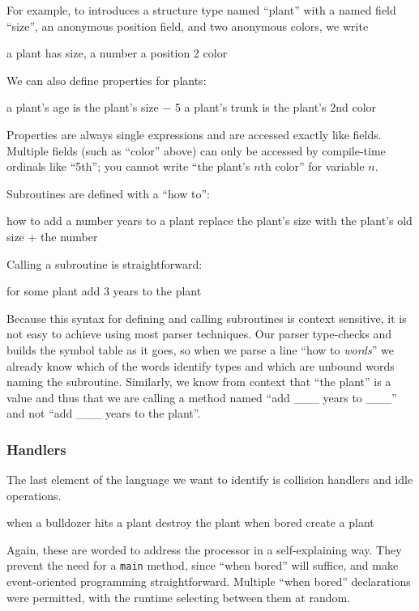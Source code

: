 \documentclass{sig-alternate}
\newcommand{\INDSTATE}[1][1]{\STATE\hspace{#1\algorithmicindent}}
\newenvironment{snippet}{\begin{algorithmic}[1]\sf}{\end{algorithmic}}
\newcommand{\code}[1]{``\textsf{#1}''}
\begin{document}
For example, to introduces a structure type named ``plant''
with a named field ``size'', an anonymous position field, and two anonymous colors,
we write
\begin{snippet}
\STATE a plant has
\INDSTATE size, a number
\INDSTATE a position
\INDSTATE 2 color
\end{snippet}
We can also define properties for plants:
\begin{snippet}
\STATE a plant's age is the plant's size $-$ 5
\STATE a plant's trunk is the plant's 2nd color
\end{snippet}
Properties are always single expressions and are accessed exactly like fields.
Multiple fields (such as \code{color} above) can only be accessed by compile-time ordinals like \code{5th};
you cannot write \code{the plant's $n$th color} for variable $n$.

Subroutines are defined with a ``how to'':
\begin{snippet}
\STATE how to add a number years to a plant
\INDSTATE replace the plant's size with the plant's old size + the number
\end{snippet}
Calling a subroutine is straightforward:
\begin{snippet}
\STATE for some plant
\INDSTATE add 3 years to the plant
\end{snippet}
Because this syntax for defining and calling subroutines
is context sensitive, it is not easy to achieve using most parser techniques.
Our parser type-checks and builds the symbol table as it goes,
so when we parse a line \code{how to {\it words}}
we already know which of the words identify types and which are unbound words naming the subroutine.
Similarly, we know from context that \code{the plant} is a value
and thus that we are calling a method named ``add \_\_\_ years to \_\_\_'' and not ``add \_\_\_ years to the plant''.

\subsubsection{Handlers}
The last element of the language we want to identify
is collision handlers and idle operations.
\begin{snippet}
\STATE when a bulldozer hits a plant
\INDSTATE destroy the plant
\STATE when bored
\INDSTATE create a plant
\end{snippet}
Again, these are worded to address the processor in a self-explaining way.
They prevent the need for a \texttt{main} method, since \code{when bored} will suffice,
and make event-oriented programming straightforward.
Multiple \code{when bored} declarations were permitted,
with the runtime selecting between them at random.
\end{document}
